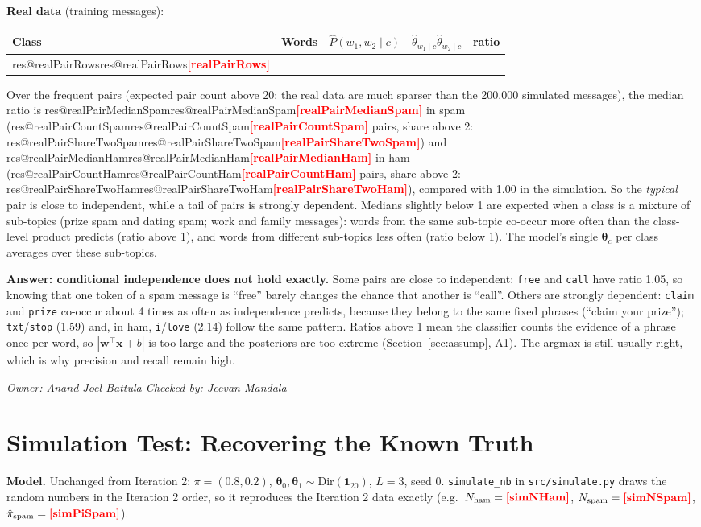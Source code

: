 \documentclass[11pt]{article}
\makeatletter
\newcommand{\fillin}[1]{\textcolor{red}{\textbf{[#1]}}}
\newcommand{\res}[1]{\ifcsname res@#1\endcsname\csname res@#1\endcsname\else\fillin{#1}\fi}
\newcommand{\owner}[2]{\par\noindent\textit{Owner: #1 \hfill Checked by: #2}\par\medskip}
\theoremstyle{plain}
\newcommand{\bx}{\mathbf{x}}
\newcommand{\bw}{\mathbf{w}}
\makeatother
\begin{document}
\textbf{Real data} (training messages):
\begin{center}
\small
\begin{tabular}{@{}llccc@{}}
\toprule
Class & Words & $\hat P(w_1,w_2\mid c)$ & $\hat\theta_{w_1\mid c}\hat\theta_{w_2\mid c}$ & ratio\\
\midrule
\res{realPairRows}\\
\bottomrule
\end{tabular}
\end{center}
Over the frequent pairs (expected pair count above 20; the real data are much sparser than the
200{,}000 simulated messages), the median ratio is \res{realPairMedianSpam}
in spam (\res{realPairCountSpam} pairs, share above 2: \res{realPairShareTwoSpam}) and
\res{realPairMedianHam} in ham (\res{realPairCountHam} pairs, share above 2: \res{realPairShareTwoHam}),
compared with 1.00 in the simulation. So the \emph{typical} pair is close to independent, while a
tail of pairs is strongly dependent. Medians slightly below 1 are expected when a class is a mixture
of sub-topics (prize spam and dating spam; work and family messages): words from the same sub-topic
co-occur more often than the class-level product predicts (ratio above 1), and words from different
sub-topics less often (ratio below 1). The model's single $\boldsymbol\theta_c$ per class averages
over these sub-topics.

\textbf{Answer: conditional independence does not hold exactly.} Some pairs are close to
independent: \texttt{free} and \texttt{call} have ratio 1.05, so knowing that one token of a spam
message is ``free'' barely changes the chance that another is ``call''. Others are strongly
dependent: \texttt{claim} and \texttt{prize} co-occur about 4 times as often as independence predicts,
because they belong to the same fixed phrases (``claim your prize''); \texttt{txt}/\texttt{stop}
(1.59) and, in ham, \texttt{i}/\texttt{love} (2.14) follow the same pattern. Ratios above 1 mean the
classifier counts the evidence of a phrase once per word, so $|\bw^\top\bx+b|$ is too large and the
posteriors are too extreme (Section~\ref{sec:assump}, A1). The argmax is still usually right, which is
why precision and recall remain high.
\owner{Anand Joel Battula}{Jeevan Mandala}

\section{Simulation Test: Recovering the Known Truth}\label{sec:sim}
\textbf{Model.} Unchanged from Iteration 2: $\pi=(0.8,0.2)$, $\boldsymbol\theta_0,\boldsymbol\theta_1\sim
\mathrm{Dir}(\mathbf 1_{20})$, $L=3$, seed 0. \texttt{simulate\_nb} in \texttt{src/simulate.py} draws
the random numbers in the Iteration 2 order, so it reproduces the Iteration 2 data exactly
(e.g.\ $N_{\text{ham}}=\res{simNHam}$, $N_{\text{spam}}=\res{simNSpam}$, $\hat\pi_{\text{spam}}=\res{simPiSpam}$).
\end{document}
